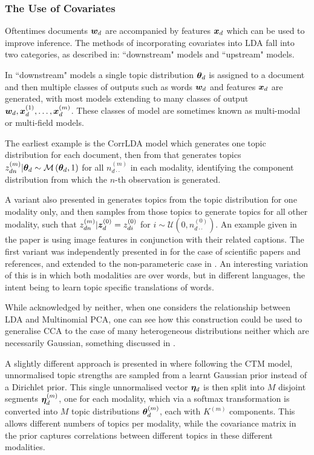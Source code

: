 

\subsubsection{The Use of Covariates}
Oftentimes documents $\bm w_d$ are accompanied by features $\bm x_d$ which can be used to improve inference. The methods of incorporating covariates into LDA fall into two categories, as described in\cite{Mimno2008}: ``downstream" models and ``upstream" models.

In ``downstream" models a single topic distribution ${ \bm \theta_d }$ is assigned to a document and then multiple classes of outputs such as words $\bm w_d$ and features $\bm x_d$ are generated, with most models extending to many classes of output $\bm w_d, \bm x_d^{(1)}, \ldots, \bm x_d^{(m)}$. These classes of model are sometimes known as multi-modal\cite{Virtanen2012a} or multi-field\cite{Salomatin2009} models.

The earliest example is the CorrLDA model\cite{Blei2003} which generates one topic distribution for each document, then from that generates topics $z_{dn}^{(m)}|{ \bm \theta_d } \sim \mathcal{M} \left( {{ \bm \theta_d }},{1} \right)$ for all $n_{d\cdot\cdot}^{(m)}$ in each modality, identifying the component distribution from which the $n$-th observation is generated.

A variant also presented in\cite{Blei2003} generates topics from the topic distribution for one modality only, and then samples from those topics to generate topics for all other modality, such that $z_{dn}^{(m)}|\bm z_d^{(0)} = z_{di}^{(0)}$ for $i \sim \mathcal{U}(0, n_{d\cdot\cdot}^{(0)})$. An example given in the paper is using image features in conjunction with their related captions. The first variant was independently presented in \cite{Erosheva2004} for the case of scientific papers and references, and extended to the non-parameteric case in \cite{Yakhnenko2009}. An interesting variation of this is \cite{Zhao2001} in which both modalities are over words, but in different languages, the intent being to learn topic specific translations of words.

While acknowledged by neither, when one considers the relationship between LDA and Multinomial PCA\cite{Buntine2002}, one can see how this construction could be used to generalise CCA to the case of many heterogeneous distributions neither which are necessarily Gaussian, something discussed in \cite{Virtanen2012a}. 

A slightly different approach is presented in \cite{Salomatin2009} where following the CTM model\cite{Blei2006}, unnormalised topic strengths are sampled from a learnt Gaussian prior instead of a Dirichlet prior. This single unnormalised vector $\bm \eta_d$ is then split into $M$ disjoint segments $\bm \eta_d^{(m)}$, one for each modality, which via a softmax transformation is converted into $M$ topic distributions $\bm \theta_d^{(m)}$, each with $K^{(m)}$ components. This allows different numbers of topics per modality, while the covariance matrix in the prior captures correlations between different topics in these different modalities.

